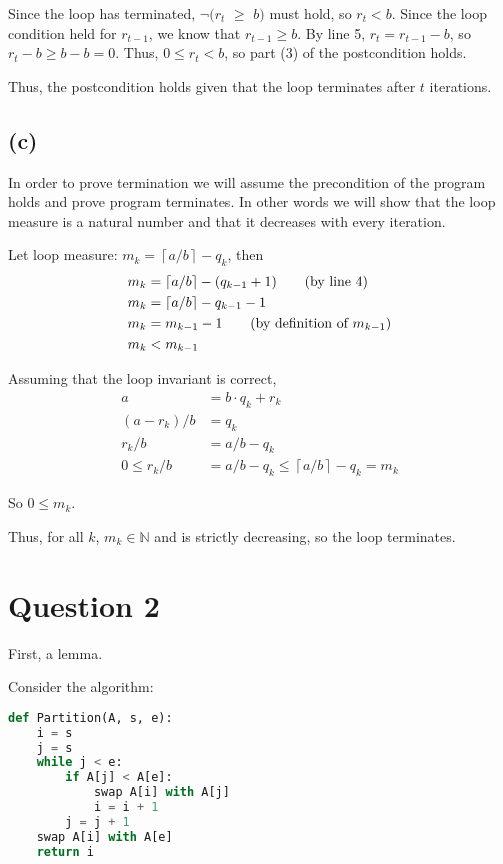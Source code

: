 \documentclass[12pt]{article}
\newcommand{\N}{\mathbb{N}}
\newcommand{\ceil}[1]{\left\lceil #1 \right\rceil}
\begin{document}
Since the loop has terminated, $\neg (r_t$ $\geq$ $b)$ must hold, so $r_t < b$. Since the loop condition held for $r_{t-1}$, we know that $r_{t-1} \geq b$. By line 5, $r_t = r_{t-1} - b$, so $r_t - b \geq b - b = 0$. Thus, $0 \leq r_t < b$, so part (3) of the postcondition holds.

Thus, the postcondition holds given that the loop terminates after $t$ iterations.

\subsection*{(c)}
In order to prove termination we will assume the precondition of the program holds and prove program terminates. In other words we will show that the loop measure is a natural number and that it decreases with every iteration.

Let loop measure: $m_k = \ceil{a/b} - q_k$, then
\begin{align*}
    m_k &= \ceil{a/b} - (q_{k-1} + 1) \tag{by line 4} \\
    m_k &= \ceil{a/b} - q_{k-1} - 1 \\
    m_k &= m_{k-1} - 1 \tag{by definition of $m_{k-1}$} \\
    m_k &< m_{k-1}
\end{align*}

Assuming that the loop invariant is correct,
\begin{align*}
    a &= b \cdot q_k + r_k \\
    (a - r_k)/b &= q_k \\
    r_k/b &= a/b - q_k \\
    0 \leq r_k/b &= a/b - q_k \leq \ceil{a/b} - q_k = m_k \tag{since by $LI(k)$, $r_k \geq 0$}
\end{align*}

So $0 \leq m_k$.

Thus, for all $k$, $m_k \in \N$ and is strictly decreasing, so the loop terminates.


\newpage
\section*{Question 2}

First, a lemma.

Consider the algorithm:
\begin{lstlisting}[language=Python, firstnumber=0]
def Partition(A, s, e):
    i = s
    j = s
    while j < e:
        if A[j] < A[e]:
            swap A[i] with A[j]
            i = i + 1
        j = j + 1
    swap A[i] with A[e]
    return i
\end{lstlisting}
\end{document}
